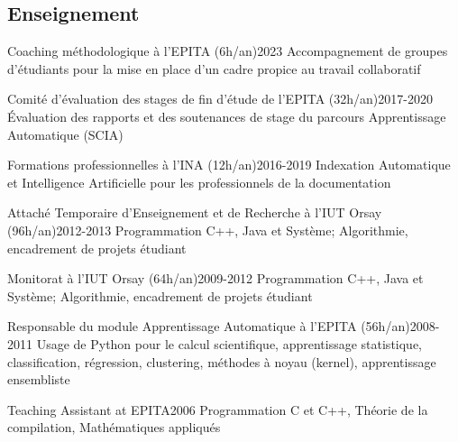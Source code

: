 \begin{fr}
\subsection{Enseignement}

\begin{jobshort}{Coaching méthodologique à l'EPITA (6h/an)}{2023}
Accompagnement de groupes d'étudiants pour la mise en place d'un cadre propice au travail collaboratif
\end{jobshort}

\begin{jobshort}{Comité d'évaluation des stages de fin d'étude de l'EPITA (32h/an)}{2017-2020}
\'Evaluation des rapports et des soutenances de stage du parcours Apprentissage Automatique (SCIA)
\end{jobshort}

\begin{jobshort}{Formations professionnelles à l'INA (12h/an)}{2016-2019}
Indexation Automatique et Intelligence Artificielle pour les professionnels de la documentation
\end{jobshort}

\begin{jobshort}{Attaché Temporaire d'Enseignement et de Recherche à l'IUT Orsay (96h/an)}{2012-2013}
Programmation C++, Java et Système; Algorithmie, encadrement de projets étudiant
\end{jobshort}

\begin{jobshort}{Monitorat à l'IUT Orsay (64h/an)}{2009-2012}
Programmation C++, Java et Système; Algorithmie, encadrement de projets étudiant
\end{jobshort}

\begin{jobshort}{Responsable du module Apprentissage Automatique à l'EPITA (56h/an)}{2008-2011}
Usage de Python pour le calcul scientifique, apprentissage statistique, classification, régression, clustering, méthodes à noyau (kernel), apprentissage ensembliste
\end{jobshort}

\begin{jobshort}{Teaching Assistant at EPITA}{2006}
Programmation C et C++, Théorie de la compilation,  Mathématiques appliqués
\end{jobshort}

\end{fr}









